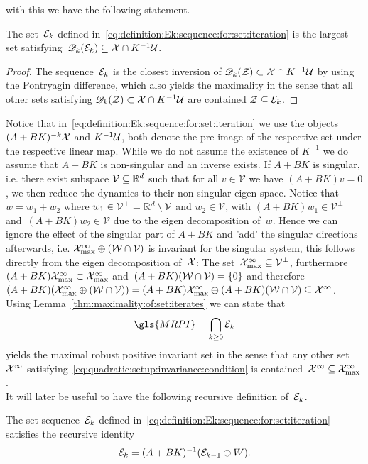 %
with this we have the following statement.
%
\begin{thm}\label{thm:maximality:of:set:iterates}
The set~$\mathcal E_k$ defined in~\eqref{eq:definition:Ek:sequence:for:set:iteration} is the largest set satisfying~$\mathscr D_k(\mathcal E_k)\subseteq\mathcal X\cap K^{-1}\mathcal U$.
\end{thm}
%
\begin{proof}
The sequence~$\mathcal E_k$ is the closest inversion of $\mathscr D_k(\mathcal Z)\subset\mathcal X\cap K^{-1}\mathcal U$ by using the Pontryagin difference, which also yields the maximality in the sense that all other sets satisfying $\mathscr D_k(\mathcal Z)\subset\mathcal X\cap K^{-1}\mathcal U$ are contained $\mathcal Z\subseteq\mathcal E_k$.
\end{proof}
%
\noindent Notice that in~\eqref{eq:definition:Ek:sequence:for:set:iteration} we use the objects~$(A+BK)^{-k}\mathcal X$ and $K^{-1}\mathcal U$, both denote the pre-image of the respective set under the respective linear map.
%
While we do not assume the existence of $K^{-1}$ we do assume that $A+BK$ is non-singular and an inverse exists.
%
If $A+BK$ is singular, i.e. there exist subspace $\mathcal V\subseteq\mathbb R^d$ such that for all $v\in\mathcal V$ we have $(A+BK)v=0$, we then reduce the dynamics to their non-singular eigen space.
%
Notice that $w=w_1+w_2$ where $w_1\in\mathcal V^\perp=\mathbb R^d\setminus\mathcal V$ and $w_2\in\mathcal V$, with $(A+BK)w_1\in\mathcal V^\perp$ and~$(A+BK)w_2\in\mathcal V$ due to the eigen decomposition of~$w$. 
%
Hence we can ignore the effect of the singular part of $A+BK$ and 'add' the singular directions afterwards, i.e. $\mathcal X^\infty_{\max}\oplus(\mathcal W\cap\mathcal V)$ is invariant for the singular system, this follows directly from the eigen decomposition of~$\mathcal X$: 
%
The set~$\mathcal X^\infty_{\max}\subseteq\mathcal V^\perp$, furthermore~$(A+BK)\mathcal X^\infty_{\max}\subset\mathcal X^\infty_{\max}$ and~$(A+BK)(\mathcal W\cap\mathcal V)=\{0\}$ and therefore~$(A+BK)(\mathcal X^\infty_{\max}\oplus(\mathcal W\cap\mathcal V))=(A+BK)\mathcal X^\infty_{\max}\oplus(A+BK)(\mathcal W\cap\mathcal V)\subseteq\mathcal X^\infty$.
%
\\[1em]
%
\noindent Using Lemma~\ref{thm:maximality:of:set:iterates} we can state that
%
\begin{equation}\label{eq:infinite:sequence:defining:MRPI}
	\gls{MRPI}=\bigcap_{k\geq0} \E_k
\end{equation}
%
yields the maximal robust positive invariant set in the sense that any other set~$\mathcal X^\infty$ satisfying~\eqref{eq:quadratic:setup:invariance:condition} is contained~$\mathcal X^\infty\subseteq\mathcal X^\infty_{\max}$.
%
\\[1em]
%
It will later be useful to have the following recursive definition of~$\mathcal E_k$.
%
\begin{cor}\label{thm:recursive:definition:of:Ek}
The set sequence~$\mathcal E_k$ defined in~\eqref{eq:definition:Ek:sequence:for:set:iteration} satisfies the recursive identity
\begin{equation}\label{eq:iteration:on:Ek:for:mark}
	\mathcal E_k = (A+BK)^{-1}(\mathcal E_{k-1}\ominus W).
\end{equation}
\end{cor}
